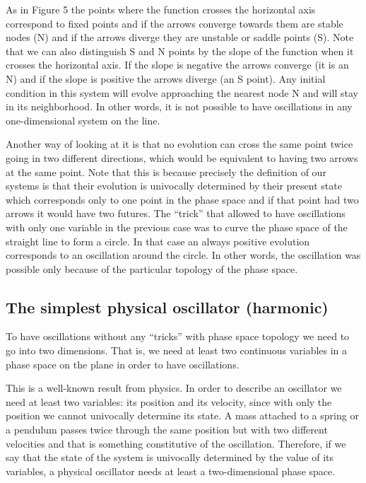\documentclass{article}
\begin{document}
As in Figure 5 the points where the function crosses the horizontal axis correspond to fixed points and if the arrows converge towards them are stable nodes (N) and if the arrows diverge they are unstable or saddle points (S). 
Note that we can also distinguish S and N points by the slope of the function when it crosses the horizontal axis. 
If the slope is negative the arrows converge (it is an N) and if the slope is positive the arrows diverge (an S point). 
Any initial condition in this system will evolve approaching the nearest node N and will stay in its neighborhood. In other words, it is not possible to have oscillations in any one-dimensional system on the line. 

Another way of looking at it is that no evolution can cross the same point twice going in two different directions, which would be equivalent to having two arrows at the same point. 
Note that this is because precisely the definition of our systems is that their evolution is univocally determined by their present state which corresponds only to one point in the phase space and if that point had two arrows it would have two futures. 
The “trick” that allowed to have oscillations with only one variable in the previous case was to curve the phase space of the straight line to form a circle. 
In that case an always positive evolution corresponds to an oscillation around the circle. 
In other words, the oscillation was possible only because of the particular topology of the phase space. 

\subsection{The simplest physical oscillator (harmonic)}

To have oscillations without any “tricks” with phase space topology we need to go into two dimensions. 
That is, we need at least two continuous variables in a phase space on the plane in order to have oscillations. 

This is a well-known result from physics. 
In order to describe an oscillator we need at least two variables: its position and its velocity, since with only the position we cannot univocally determine its state. 
A mass attached to a spring or a pendulum passes twice through the same position but with two different velocities and that is something constitutive of the oscillation. 
Therefore, if we say that the state of the system is univocally determined by the value of its variables, a physical oscillator needs at least a two-dimensional phase space. 
\end{document}
